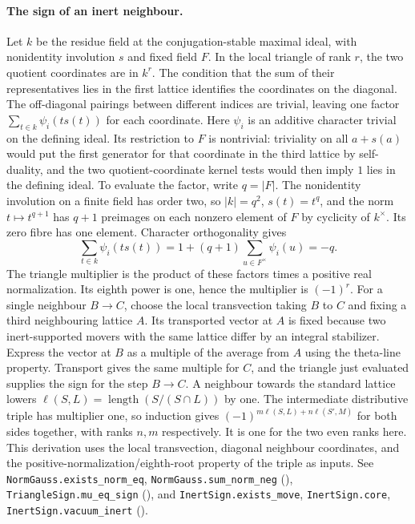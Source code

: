 \paragraph{The sign of an inert neighbour.}\label{r14:weil-sign}
Let $k$ be the residue field at the conjugation-stable maximal ideal,
with nonidentity involution $s$ and fixed field $F$. In the local
triangle of rank $r$, the two quotient coordinates are in $k^r$.
The condition that the sum of their representatives lies in the first
lattice identifies the coordinates on the diagonal. The off-diagonal
pairings between different indices are trivial, leaving one factor
$\sum_{t\in k}\psi_i(t s(t))$ for each coordinate. Here $\psi_i$
is an additive character trivial on the defining ideal. Its restriction
to $F$ is nontrivial: triviality on all $a+s(a)$ would put the first
generator for that coordinate in the third lattice by self-duality,
and the two quotient-coordinate kernel tests would then imply
$1$ lies in the defining ideal. To evaluate the factor, write
$q=|F|$. The nonidentity involution on a finite field has order two,
so $|k|=q^2$, $s(t)=t^q$, and the norm $t\mapsto t^{q+1}$ has
$q+1$ preimages on each nonzero element of $F$ by cyclicity of $k^\times$.
Its zero fibre has one element. Character orthogonality gives
\[
 \sum_{t\in k}\psi_i(t s(t))
     =1+(q+1)\sum_{u\in F^\times}\psi_i(u)=-q .
\]
The triangle multiplier is the product of these factors times a
positive real normalization. Its eighth power is one, hence the
multiplier is $(-1)^r$. For a single neighbour $B\to C$, choose the
local transvection taking $B$ to $C$ and fixing a third neighbouring
lattice $A$. Its transported vector at $A$ is fixed because two
inert-supported movers with the same lattice differ by an integral
stabilizer. Express the vector at $B$ as a multiple of the average
from $A$ using the theta-line property. Transport gives the same multiple
for $C$, and the triangle just evaluated supplies the sign for the
step $B\to C$. A neighbour towards the standard lattice lowers
$\ell(S,L)=\operatorname{length}(S/(S\cap L))$ by one. The intermediate
distributive triple has multiplier one, so induction gives
$(-1)^{m\ell(S,L)+n\ell(S',M)}$ for both sides together, with ranks
$n,m$ respectively. It is one for the two even ranks here. This
derivation uses the local transvection, diagonal neighbour coordinates,
and the positive-normalization/eighth-root property of the triple as
inputs. See \nolinkurl{NormGauss.exists_norm_eq}, \nolinkurl{NormGauss.sum_norm_neg}
(),
\nolinkurl{TriangleSign.mu_eq_sign}
(), and
\nolinkurl{InertSign.exists_move}, \nolinkurl{InertSign.core}, \nolinkurl{InertSign.vacuum_inert}
().

